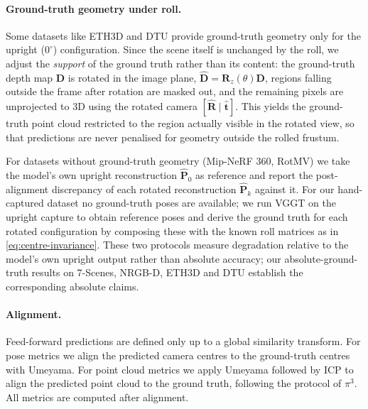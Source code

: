 \paragraph{Ground-truth geometry under roll.}
Some datasets like ETH3D and DTU provide ground-truth geometry only for the upright
($0^{\circ}$) configuration. Since the scene itself is unchanged by
the roll, we adjust the \emph{support} of the ground truth rather than
its content: the ground-truth depth map $\mathbf{D}$ is rotated in the
image plane, $\hat{\mathbf{D}} = \mathbf{R}_z(\theta)\mathbf{D}$,
regions falling outside the frame after rotation are masked out, and
the remaining pixels are unprojected to 3D using the rotated camera
$[\hat{\mathbf{R}} \mid \hat{\mathbf{t}}]$. This yields the ground-truth
point cloud restricted to the region actually visible in the rotated
view, so that predictions are never penalised for geometry outside the
rolled frustum.

For datasets without ground-truth geometry (Mip-NeRF 360,
RotMV) we take the model's own upright
reconstruction $\hat{\mathbf{P}}_0$ as reference and report the
post-alignment discrepancy of each rotated reconstruction
$\hat{\mathbf{P}}_k$ against it. For our hand-captured dataset no
ground-truth poses are available; we run VGGT on the upright capture
to obtain reference poses and derive the ground truth for each rotated
configuration by composing these with the known roll matrices as in
\eqref{eq:centre-invariance}. These two protocols measure degradation
relative to the model's own upright output rather than absolute
accuracy; our absolute-ground-truth results on 7-Scenes, NRGB-D, ETH3D
and DTU establish the corresponding absolute claims.

\paragraph{Alignment.}
Feed-forward predictions are defined only up to a global similarity
transform. For pose metrics we align the predicted camera centres to
the ground-truth centres with Umeyama. For point
cloud metrics we apply Umeyama followed by ICP to align the predicted
point cloud to the ground truth, following the protocol of
$\pi^3$. All metrics are computed after
alignment.


